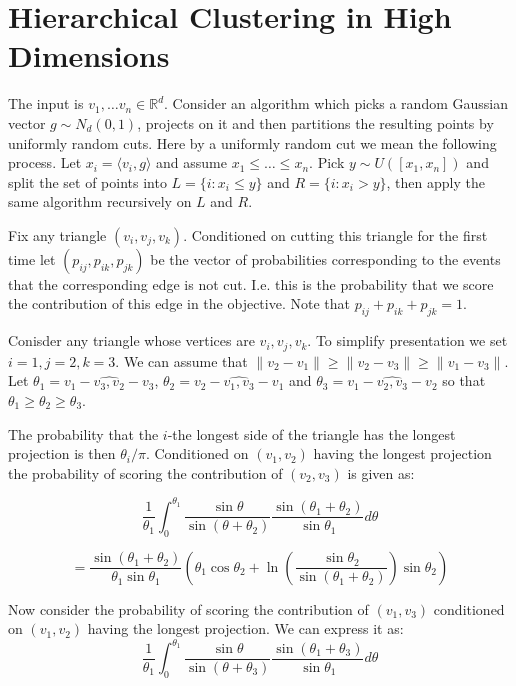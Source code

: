 \documentclass{article}
\begin{document}
\section{Hierarchical Clustering in High Dimensions}
The input is $v_1, \dots v_n \in \mathbb R^d$. Consider an algorithm which picks a random Gaussian vector $g \sim N_d(0,1)$, projects on it and then partitions the resulting points by uniformly random cuts. Here by a uniformly random cut we mean the following process. Let $x_i = \langle v_i, g \rangle$ and assume $x_1 \le \dots \le x_n$. Pick $y \sim U([x_1, x_n])$ and split the set of points into $L = \{i \colon x_i \le y\}$ and $R = \{i \colon x_i > y\}$, then apply the same algorithm recursively on $L$ and $R$.

Fix any triangle $(v_i, v_j, v_k)$. Conditioned on cutting this triangle for the first time let $(p_{ij},p_{ik},p_{jk})$ be the vector of probabilities corresponding to the events that the corresponding edge is not cut. I.e. this is the probability that we score the contribution of this edge in the objective. Note that $p_{ij} + p_{ik} + p_{jk} = 1$.

Conisder any triangle whose vertices are $v_i, v_j, v_k$. To simplify presentation we set $i = 1, j = 2, k = 3$. We can assume that $\|v_2 - v_1\| \ge \|v_2 - v_3\| \ge \|v_1 - v_3\|$. Let $\theta_1 = \widehat{v_1 - v_3, v_2 - v_3}$, $\theta_2 = \widehat{v_2 - v_1, v_3 - v_1}$ and $\theta_3 = \widehat{v_1 - v_2, v_3 - v_2}$ so that $\theta_1 \ge \theta_2 \ge \theta_3$.

The probability that the $i$-the longest side of the triangle has the longest projection is then $\theta_i/\pi$. Conditioned on $(v_1, v_2)$ having the longest projection the probability of scoring the contribution of $(v_2, v_3)$ is given as:

$$\frac{1}{\theta_1} \int_{0}^{\theta_1} \frac{\sin \theta}{\sin (\theta + \theta_2)} \frac{\sin (\theta_1 + \theta_2)}{\sin \theta_1} d\theta $$

$$= \frac{\sin (\theta_1 + \theta_2)}{\theta_1 \sin \theta_1}\left(\theta_1 \cos \theta_2 + \ln\left(\frac{\sin \theta_2}{\sin (\theta_1 + \theta_2)}\right) \sin \theta_2 \right)$$

Now consider the probability of scoring the contribution of $(v_1,v_3)$ conditioned on $(v_1,v_2)$ having the longest projection.
We can express it as:
$$\frac{1}{\theta_1} \int_0^{\theta_1} \frac{\sin \theta}{\sin (\theta + \theta_3)} \frac{\sin(\theta_1 + \theta_3)}{\sin \theta_1} d\theta$$
\end{document}
